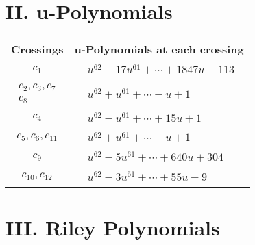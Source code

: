 \documentclass[1p]{elsarticle_modified}
\theoremstyle{definition}
\begin{document}
\newpage\renewcommand{\arraystretch}{1}
\centering \section*{ II. u-Polynomials}
\begin{tabular}{m{50pt}|m{274pt}}
Crossings & \hspace{64pt}u-Polynomials at each crossing \\
\hline $$\begin{aligned}c_{1}\end{aligned}$$&$\begin{aligned}
&u^{62}-17 u^{61}+\cdots+1847 u-113
\end{aligned}$\\
\hline $$\begin{aligned}c_{2},c_{3},c_{7}\\c_{8}\end{aligned}$$&$\begin{aligned}
&u^{62}+u^{61}+\cdots- u+1
\end{aligned}$\\
\hline $$\begin{aligned}c_{4}\end{aligned}$$&$\begin{aligned}
&u^{62}- u^{61}+\cdots+15 u+1
\end{aligned}$\\
\hline $$\begin{aligned}c_{5},c_{6},c_{11}\end{aligned}$$&$\begin{aligned}
&u^{62}+u^{61}+\cdots- u+1
\end{aligned}$\\
\hline $$\begin{aligned}c_{9}\end{aligned}$$&$\begin{aligned}
&u^{62}-5 u^{61}+\cdots+640 u+304
\end{aligned}$\\
\hline $$\begin{aligned}c_{10},c_{12}\end{aligned}$$&$\begin{aligned}
&u^{62}-3 u^{61}+\cdots+55 u-9
\end{aligned}$\\
\hline
\end{tabular}\newpage\renewcommand{\arraystretch}{1}
\centering \section*{ III. Riley Polynomials}
\end{document}
